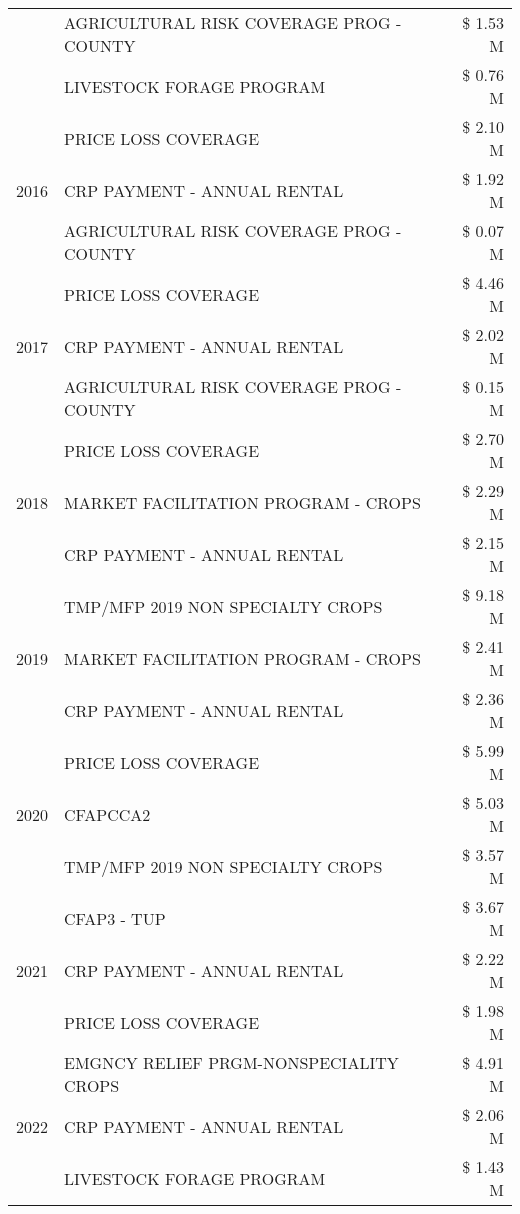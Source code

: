 \begin{tabular}{llr}
 & AGRICULTURAL RISK COVERAGE PROG - COUNTY & \$ 1.53 M \\
 & LIVESTOCK FORAGE PROGRAM & \$ 0.76 M \\
\cline{1-3}
\multirow[t]{3}{*}{2016} & PRICE LOSS COVERAGE & \$ 2.10 M \\
 & CRP PAYMENT - ANNUAL RENTAL & \$ 1.92 M \\
 & AGRICULTURAL RISK COVERAGE PROG - COUNTY & \$ 0.07 M \\
\cline{1-3}
\multirow[t]{3}{*}{2017} & PRICE LOSS COVERAGE & \$ 4.46 M \\
 & CRP PAYMENT - ANNUAL RENTAL & \$ 2.02 M \\
 & AGRICULTURAL RISK COVERAGE PROG - COUNTY & \$ 0.15 M \\
\cline{1-3}
\multirow[t]{3}{*}{2018} & PRICE LOSS COVERAGE & \$ 2.70 M \\
 & MARKET FACILITATION PROGRAM - CROPS & \$ 2.29 M \\
 & CRP PAYMENT - ANNUAL RENTAL & \$ 2.15 M \\
\cline{1-3}
\multirow[t]{3}{*}{2019} & TMP/MFP 2019 NON SPECIALTY CROPS & \$ 9.18 M \\
 & MARKET FACILITATION PROGRAM - CROPS & \$ 2.41 M \\
 & CRP PAYMENT - ANNUAL RENTAL & \$ 2.36 M \\
\cline{1-3}
\multirow[t]{3}{*}{2020} & PRICE LOSS COVERAGE & \$ 5.99 M \\
 & CFAPCCA2 & \$ 5.03 M \\
 & TMP/MFP 2019 NON SPECIALTY CROPS & \$ 3.57 M \\
\cline{1-3}
\multirow[t]{3}{*}{2021} & CFAP3 - TUP & \$ 3.67 M \\
 & CRP PAYMENT - ANNUAL RENTAL & \$ 2.22 M \\
 & PRICE LOSS COVERAGE & \$ 1.98 M \\
\cline{1-3}
\multirow[t]{3}{*}{2022} & EMGNCY RELIEF PRGM-NONSPECIALITY CROPS & \$ 4.91 M \\
 & CRP PAYMENT - ANNUAL RENTAL & \$ 2.06 M \\
 & LIVESTOCK FORAGE PROGRAM & \$ 1.43 M \\
\cline{1-3}
\bottomrule
\end{tabular}
